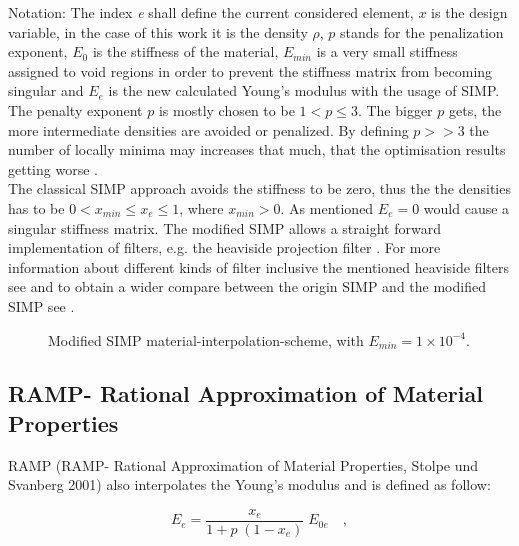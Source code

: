 Notation: The index \emph{e} shall define the current considered element, \textbf{$x$}
 is the design variable, in the case of this work
  it is the density \textbf{$\rho $}, \textbf{$p$} stands for 
  the penalization exponent, \textbf{$E_{0}$} is the stiffness of the material, \textbf{$E_{min}$ }is a very small stiffness assigned
   to void regions in order to prevent the stiffness matrix from becoming singular 
  and \textbf{$E_e$} is the new calculated Young's modulus with the usage of SIMP. The penalty exponent \textbf{$p$}
   is mostly chosen to be \textbf{$1<p \leq 3$}. The bigger \textbf{$p$} gets, the more intermediate densities are avoided or penalized. By defining \textbf{$p>>3$} the number of locally minima may increases that much, that the optimisation results getting worse \cite{Dienemann.2018}.\\

The classical SIMP approach avoids the stiffness to be zero, thus the the densities has to be \textbf{$ 0 < x_{min} \leq x_{e} \leq 1 $}, where \textbf{$x_{min}> 0 $}. As mentioned\textbf{ $E_{e} = 0$} would cause a singular stiffness matrix. The modified SIMP allows a straight forward implementation of filters, e.g. the heaviside projection filter
\cite{Andreassen.2011}. For more information about
 different kinds of filter inclusive the mentioned heaviside filters see
 \cite{Andreassen.2011} and to obtain a wider compare between the origin SIMP and the modified SIMP see \cite{Sigmund.2007}. \\

\begin{figure}[!h]
\centering
{}
\caption{Modified SIMP material-interpolation-scheme, with $E_{min} = 1 \times 10^{-4}$. }
\label{fig_SIMP_sceme_modified}
\end{figure}

\subsection{RAMP- Rational Approximation of Material Properties}
RAMP (RAMP- Rational Approximation of Material Properties, Stolpe und Svanberg 2001) also interpolates the Young's modulus and is defined as follow: 

\begin{equation}
E_e = \dfrac{x_e}{1+p \;(1-x_e)} \; E_{0e} \quad ,
\label{math_equation}
\end{equation}

